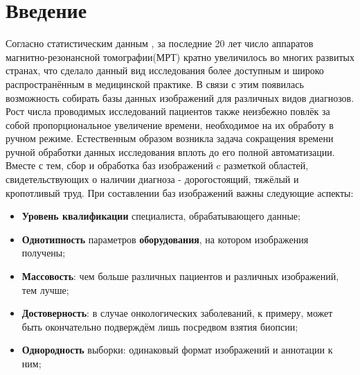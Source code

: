 \chapter*{Введение}							%

Согласно статистическим данным \cite{Stats}, за последние 20 лет число аппаратов магнитно-резонансной томографии(МРТ) кратно увеличилось во многих развитых странах, что  сделало данный вид исследования более доступным и широко распространённым в медицинской практике. В связи с этим появилась возможность собирать базы данных изображений для различных видов диагнозов.
\\
\indent Рост числа проводимых исследований пациентов также неизбежно повлёк за собой пропорциональное увеличение времени, необходимое на их обработу в ручном режиме. Естественным образом возникла задача сокращения времени ручной обработки данных исследования вплоть до его полной автоматизации.
\\
\indent Вместе с тем, сбор и обработка баз изображений c разметкой областей, свидетельствующих о наличии диагноза - дорогостоящий, тяжёлый и кропотливый труд. При составлении баз изображений важны следующие аспекты:

\begin{itemize}
    \item {\bf Уровень квалификации} специалиста, обрабатывающего данные;
    \item {\bf Однотипность} параметров {\bf оборудования}, на котором изображения получены;
    \item {\bf Массовость}: чем больше различных пациентов и различных изображений, тем лучше;
    \item {\bf Достоверность}: в случае онкологических заболеваний, к примеру, может быть окончательно подверждём лишь посредвом взятия биопсии;
    \item {\bf Однородность} выборки: одинаковый формат изображений и аннотации к ним;
\end{itemize}

